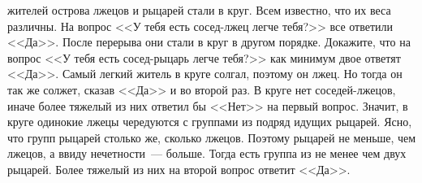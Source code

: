  жителей острова лжецов и рыцарей стали в круг.
Всем известно, что их веса различны.
На вопрос <<У тебя есть сосед-лжец легче тебя?>> все ответили <<Да>>.
После перерыва они стали в круг в другом порядке.
Докажите, что на вопрос <<У тебя есть сосед-рыцарь легче тебя?>> как минимум
двое ответят <<Да>>.
\solution
Самый легкий житель в круге солгал, поэтому он лжец.
Но тогда он так же солжет, сказав <<Да>> и во второй раз.
В круге нет соседей-лжецов, иначе более тяжелый из них ответил бы <<Нет>> на
первый вопрос.
Значит, в круге одинокие лжецы чередуются с группами из подряд идущих рыцарей.
Ясно, что групп рыцарей столько же, сколько лжецов.
Поэтому рыцарей не меньше, чем лжецов, а ввиду нечетности~--- больше.
Тогда есть группа из не менее чем двух рыцарей.
Более тяжелый из них на второй вопрос ответит <<Да>>.
\endproblem
